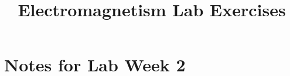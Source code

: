 \documentclass[a4paper]{article}
\title{Electromagnetism Lab Exercises}
\begin{document}
    \maketitle
    \tableofcontents
    \newpage

    \section{Notes for Lab Week 2}
\end{document}
